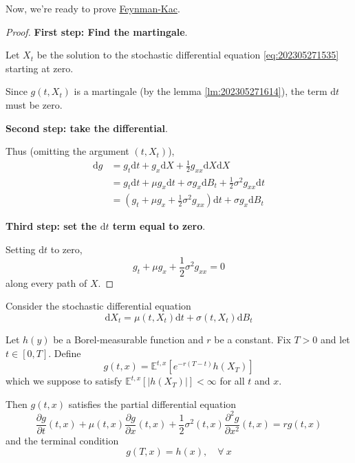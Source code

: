 Now, we're ready to prove \hyperref[thm:feynman-kac]{Feynman-Kac}.

\begin{proof}
    \textbf{First step: Find the martingale}.

    Let $X_t$ be the solution to the stochastic differential equation \eqref{eq:202305271535} starting at zero. 

    Since $g(t, X_t)$ is a martingale (by the lemma \ref{lm:202305271614}), the term $\mathrm{d}t$ must be zero.
    
    \textbf{Second step: take the differential}.
    
    Thus (omitting the argument $(t, X_t)$), 
    \begin{equation*}
        \begin{aligned}
            \mathrm{d}g &= g_t \mathrm{d}t + g_x \mathrm{d}X + \frac{1}{2}g_{xx} \mathrm{d}X \mathrm{d}X \\
            &= g_t \mathrm{d}t + \mu g_x \mathrm{d}t + \sigma g_x \mathrm{d}B_t + \frac{1}{2} \sigma^2 g_{xx} \mathrm{d}t \\
            &= \left( g_t + \mu g_x + \frac{1}{2} \sigma^2 g_{xx} \right) \mathrm{d}t + \sigma g_x \mathrm{d}B_t
        \end{aligned}
    \end{equation*}

    \textbf{Third step: set the $\mathrm{d}t$ term equal to zero}.

    Setting $\mathrm{d}t$ to zero, 
    \[
        g_t + \mu g_x + \frac{1}{2} \sigma^2 g_{xx} = 0
    \]
    along every path of $X$. 
\end{proof}

\begin{theorem}\label{thm:discounted_fk}
    Consider the stochastic differential equation 
    \begin{equation*}
        \mathrm{d}X_t = \mu(t, X_t) \mathrm{d}t + \sigma(t, X_t)\mathrm{d}B_t
    \end{equation*}

    Let $h(y)$ be a Borel-measurable function and $r$ be a constant. Fix $T > 0$ and let $t \in [0,T]$. Define 
    \begin{equation*}
        g(t, x) = \mathbb{E}^{t, x} [e^{-r(T-t)} h(X_T)]
    \end{equation*}
    which we suppose to satisfy $\mathbb{E}^{t, x} [|h(X_T)|] < \infty$ for all $t$ and $x$. 

    Then $g(t, x)$ satisfies the partial differential equation 
    \begin{equation*}
        \frac{\partial g}{\partial t}(t, x) + \mu(t, x) \frac{\partial g}{\partial x}(t, x) + \frac{1}{2} \sigma^2(t, x) \frac{\partial^2 g}{\partial x^2}(t, x) = r g(t,x)
    \end{equation*}
    and the terminal condition 
    \begin{equation*}
        g(T, x) = h(x), \quad \forall ~x
    \end{equation*}
\end{theorem}

